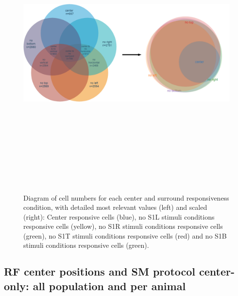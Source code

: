 \begin{figure}[H] \centering \includegraphics[width=15cm,height=15cm,keepaspectratio]{Figures/7.Results/data/SMdata.png} 
\caption{Diagram of cell numbers for each center and surround responsiveness condition, with detailed most relevant values (left) and scaled (right): Center responsive cells (blue), no S1L stimuli conditions responsive cells (yellow), no S1R stimuli conditions responsive cells (green), no S1T stimuli conditions responsive cells (red) and no S1B stimuli conditions responsive cells (green).}
\label{groups3}
\end{figure}

\subsection{RF center positions and SM protocol center-only: all population and per animal}

